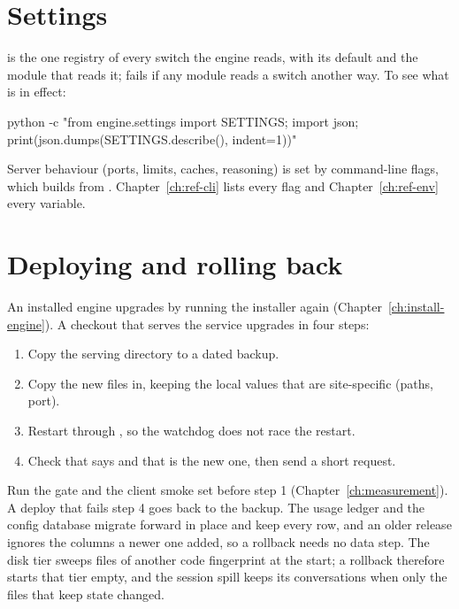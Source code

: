 \section{Settings}

 is the one registry of every  switch the engine reads, with its default and the module that reads it;  fails if any module reads a switch another way. To see what is in effect:

\begin{shell}
python -c "from engine.settings import SETTINGS; import json; print(json.dumps(SETTINGS.describe(), indent=1))"
\end{shell}

Server behaviour (ports, limits, caches, reasoning) is set by command-line flags, which  builds from . Chapter~\ref{ch:ref-cli} lists every flag and Chapter~\ref{ch:ref-env} every variable.

\section{Deploying and rolling back}

An installed engine upgrades by running the installer again (Chapter~\ref{ch:install-engine}). A checkout that serves the service upgrades in four steps:

\begin{enumerate}
\item Copy the serving directory to a dated backup.
\item Copy the new files in, keeping the local  values that are site-specific (paths, port).
\item Restart through , so the watchdog does not race the restart.
\item Check that  says  and that  is the new one, then send a short request.
\end{enumerate}

Run the gate and the client smoke set before step 1 (Chapter~\ref{ch:measurement}). A deploy that fails step 4 goes back to the backup. The usage ledger and the config database migrate forward in place and keep every row, and an older release ignores the columns a newer one added, so a rollback needs no data step. The disk tier sweeps files of another code fingerprint at the start; a rollback therefore starts that tier empty, and the session spill keeps its conversations when only the files that keep state changed.
